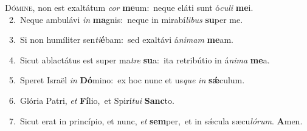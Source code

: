 \lettrine{\initial\textcolor{\initialcolor}{D}}{ómine,} non est exaltátum \textit{cor} \textbf{me}\-um:~\star neque eláti sunt ó\-\textit{cu}\-\textit{li} \textbf{me}\-i.\\
{\numbfont\textcolor{\numbcolor}{~2.}}~Neque ambulávi \textit{in} \textbf{ma}\-gnis:~\star neque in mirabí\-\textit{li}\-\textit{bus} \textbf{su}\-per me.\par
{\numbfont\textcolor{\numbcolor}{~3.}}~Si non humíliter sen\-\textit{ti}\-\textbf{é}bam:~\star sed exaltávi á\-\textit{ni}\-\textit{mam} \textbf{me}\-am.\par
{\numbfont\textcolor{\numbcolor}{~4.}}~Sicut ablactátus est super ma\textit{tre} \textbf{su}\-a:~\star ita retribútio in á\-\textit{ni}\-\textit{ma} \textbf{me}\-a.\par
{\numbfont\textcolor{\numbcolor}{~5.}}~Speret Israël \textit{in} \textbf{Dó}\-mino:~\star ex hoc nunc et us\textit{que} \textit{in} \textbf{sǽ}\-culum.\par
{\numbfont\textcolor{\numbcolor}{~6.}}~Glória Patri, \textit{et} \textbf{Fí}\-lio,~\star et Spirí\-\textit{tu}\-\textit{i} \textbf{Sanc}\-to.\par
{\numbfont\textcolor{\numbcolor}{~7.}}~Sicut erat in princípio, et nunc, \textit{et} \textbf{sem}\-per,~\star et in sǽcula sæcu\-\textit{ló}\-\textit{rum}. \textbf{A}\-men.\par

